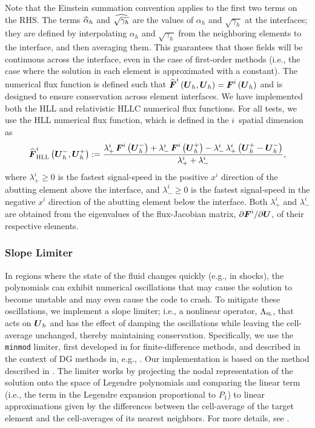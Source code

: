 Note that the Einstein summation convention applies to the
first two terms on the RHS.
The terms $\widehat{\alpha}_{h}$ and $\widehat{\sqrt{\gamma_{h}}}$
are the values of $\alpha_{h}$ and $\sqrt{\gamma_{h}}$ at the interfaces;
they are defined by interpolating
$\alpha_{h}$ and $\sqrt{\gamma_{h}}$ from the neighboring
elements to the interface, and then averaging them.
This guarantees that those fields will be continuous across the interface,
even in the case of first-order methods (i.e., the case where the solution
in each element is approximated with a constant).
The numerical flux function is defined such that
$\widehat{\boldsymbol{F}}^{i}\left(\boldsymbol{U}_{h},\boldsymbol{U}_{h}\right)
=\boldsymbol{F}^{i}\left(\boldsymbol{U}_{h}\right)$ and is designed to ensure
conservation across element interfaces.
We have implemented both the HLL \citep{hll1983}
and relativistic HLLC \citep{mb2005} numerical flux functions.
For all tests, we use the HLL numerical flux function,
which is defined in the $i$\myth\ spatial dimension as
\citep{mb2005}
\begin{equation}
  \widehat{\boldsymbol{F}}_{\textsc{HLL}}^{i}\left(\boldsymbol{U}_{h}^{-},\boldsymbol{U}_{h}^{+}\right)
  :=\frac{
   \lambda_{+}^{i}\,\boldsymbol{F}^{i}\left(\boldsymbol{U}_{h}^{-}\right)
  +\lambda_{-}^{i}\,\boldsymbol{F}^{i}\left(\boldsymbol{U}_{h}^{+}\right)
  -\lambda_{-}^{i}\,\lambda_{+}^{i}
  \left(\boldsymbol{U}_{h}^{+}-\boldsymbol{U}_{h}^{-}\right)}
  {\lambda_{+}^{i}+\lambda_{-}^{i}},
\end{equation}
where $\lambda_{+}^{i}\geq0$ is the fastest
signal-speed in the positive $x^{i}$ direction of the abutting element above
the interface,
and
$\lambda_{-}^{i}\geq0$ is the fastest
signal-speed in the negative $x^{i}$ direction of the abutting element below
the interface.
Both $\lambda_{+}^{i}$ and $\lambda_{-}^{i}$
are obtained from the eigenvalues of the flux-Jacobian matrix,
$\partial\boldsymbol{F}^{i}/\partial\boldsymbol{U}$,
of their respective elements.

\subsubsection{Slope Limiter}

In regions where the state of the fluid changes quickly (e.g., in shocks),
the polynomials can exhibit numerical
oscillations that may cause the solution to become unstable and may even
cause the code to crash.
To mitigate these oscillations, we implement a slope limiter;
i.e., a nonlinear operator, $\Lambda_{\textsc{sl}}$, that acts on $\boldsymbol{U}_{h}$
and has the effect of damping the oscillations while leaving the
cell-average unchanged, thereby maintaining conservation.
Specifically, we use the \texttt{minmod} limiter,
first developed in \cite{h1983} for finite-difference methods,
and described in the context of DG methods in, e.g., \citet{s1987}.
Our implementation is based on the method described in \citet{sbc2015}.
The limiter works by projecting the nodal representation of the solution
onto the space of Legendre polynomials and comparing the linear
term (i.e., the term in the Legendre expansion proportional to $P_{1}$)
to linear approximations given by the differences between the cell-average
of the target element and the cell-averages of its nearest neighbors.
For more details, see \citet{pbe2021}.

